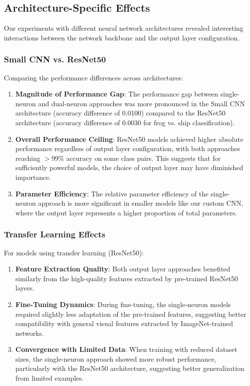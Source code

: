 \subsection{Architecture-Specific Effects}

Our experiments with different neural network architectures revealed interesting interactions between the network backbone and the output layer configuration.

\subsubsection{Small CNN vs. ResNet50}

Comparing the performance differences across architectures:

\begin{enumerate}
\item \textbf{Magnitude of Performance Gap}: The performance gap between single-neuron and dual-neuron approaches was more pronounced in the Small CNN architecture (accuracy difference of 0.0100) compared to the ResNet50 architecture (accuracy difference of 0.0030 for frog vs. ship classification).

\item \textbf{Overall Performance Ceiling}: ResNet50 models achieved higher absolute performance regardless of output layer configuration, with both approaches reaching $>$99\% accuracy on some class pairs. This suggests that for sufficiently powerful models, the choice of output layer may have diminished importance.

\item \textbf{Parameter Efficiency}: The relative parameter efficiency of the single-neuron approach is more significant in smaller models like our custom CNN, where the output layer represents a higher proportion of total parameters.
\end{enumerate}

\subsubsection{Transfer Learning Effects}

For models using transfer learning (ResNet50):

\begin{enumerate}
\item \textbf{Feature Extraction Quality}: Both output layer approaches benefited similarly from the high-quality features extracted by pre-trained ResNet50 layers.

\item \textbf{Fine-Tuning Dynamics}: During fine-tuning, the single-neuron models required slightly less adaptation of the pre-trained features, suggesting better compatibility with general visual features extracted by ImageNet-trained networks.

\item \textbf{Convergence with Limited Data}: When training with reduced dataset sizes, the single-neuron approach showed more robust performance, particularly with the ResNet50 architecture, suggesting better generalization from limited examples.
\end{enumerate}

